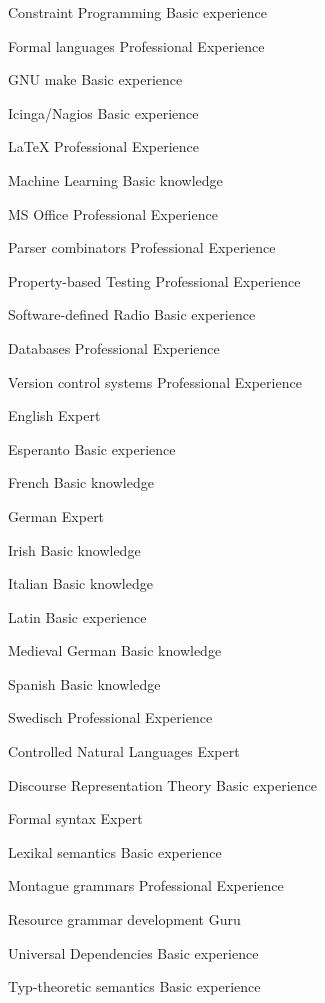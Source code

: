 \documentclass[11pt, a4]{academic-cv}
\begin{document}
\begin{cvskills}
\cvskill
{}
{Constraint Programming}
{Basic experience}

\cvskill
{}
{Formal languages}
{Professional Experience}

\cvskill
{}
{GNU make}
{Basic experience}

\cvskill
{}
{Icinga/Nagios}
{Basic experience}

\cvskill
{}
{LaTeX}
{Professional Experience}

\cvskill
{}
{Machine Learning}
{Basic knowledge}

\cvskill
{}
{MS Office}
{Professional Experience}

\cvskill
{}
{Parser combinators}
{Professional Experience}

\cvskill
{}
{Property-based Testing}
{Professional Experience}

\cvskill
{}
{Software-defined Radio}
{Basic experience}

\cvskill
{}
{Databases}
{Professional Experience}

\cvskill
{}
{Version control systems}
{Professional Experience}

\end{cvskills}

\begin{cvskills}
\cvskill
{}
{English}
{Expert}

\cvskill
{}
{Esperanto}
{Basic experience}

\cvskill
{}
{French}
{Basic knowledge}

\cvskill
{}
{German}
{Expert}

\cvskill
{}
{Irish}
{Basic knowledge}

\cvskill
{}
{Italian}
{Basic knowledge}

\cvskill
{}
{Latin}
{Basic experience}

\cvskill
{}
{Medieval German}
{Basic knowledge}

\cvskill
{}
{Spanish}
{Basic knowledge}

\cvskill
{}
{Swedisch}
{Professional Experience}

\end{cvskills}

\begin{cvskills}
\cvskill
{}
{Controlled Natural Languages}
{Expert}

\cvskill
{}
{Discourse Representation Theory}
{Basic experience}

\cvskill
{}
{Formal syntax}
{Expert}

\cvskill
{}
{Lexikal semantics}
{Basic experience}

\cvskill
{}
{Montague grammars}
{Professional Experience}

\cvskill
{}
{Resource grammar development}
{Guru}

\cvskill
{}
{Universal Dependencies}
{Basic experience}

\cvskill
{}
{Typ-theoretic semantics}
{Basic experience}

\end{cvskills}
\end{document}
